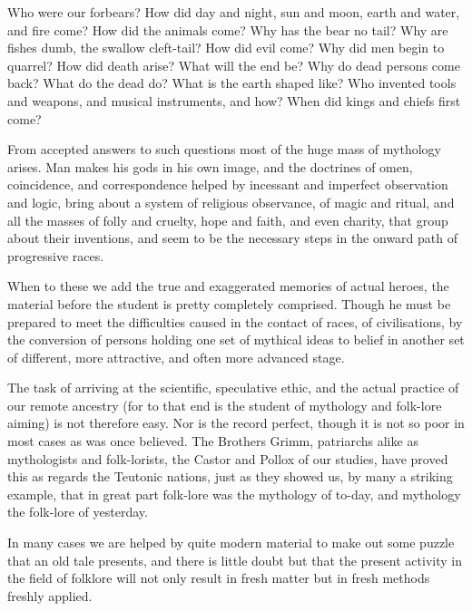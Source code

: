\documentclass[10pt,a4paper]{report}
\begin{document}
Who were our forbears? How did day and night, sun and moon, earth and water, and fire come? How did the animals come? Why has the bear no tail? Why are fishes dumb, the swallow cleft-tail? How did evil come? Why did men begin to quarrel? How did death arise? What will the end be? Why do dead persons come back? What do the dead do? What is the earth shaped like? Who invented tools and weapons, and musical instruments, and how? When did kings and chiefs first come?

From accepted answers to such questions most of the huge mass of mythology arises. Man makes his gods in his own image, and the doctrines of omen, coincidence, and correspondence helped by incessant and imperfect observation and logic, bring about a system of religious observance, of magic and ritual, and all the masses of folly and cruelty, hope and faith, and even charity, that group about their inventions, and seem to be the necessary steps in the onward path of progressive races.

When to these we add the true and exaggerated memories of actual heroes, the material before the student is pretty completely comprised. Though he must be prepared to meet the difficulties caused in the contact of races, of civilisations, by the conversion of persons holding one set of mythical ideas to belief in another set of different, more attractive, and often more advanced stage.

The task of arriving at the scientific, speculative ethic, and the actual practice of our remote ancestry (for to that end is the student of mythology and folk-lore aiming) is not therefore easy. Nor is the record perfect, though it is not so poor in most cases as was once believed. The Brothers Grimm, patriarchs alike as mythologists and folk-lorists, the Castor and Pollox of our studies, have proved this as regards the Teutonic nations, just as they showed us, by many a striking example, that in great part folk-lore was the mythology of to-day, and mythology the folk-lore of yesterday.

In many cases we are helped by quite modern material to make out some puzzle that an old tale presents, and there is little doubt but that the present activity in the field of folklore will not only result in fresh matter but in fresh methods freshly applied.
\end{document}
